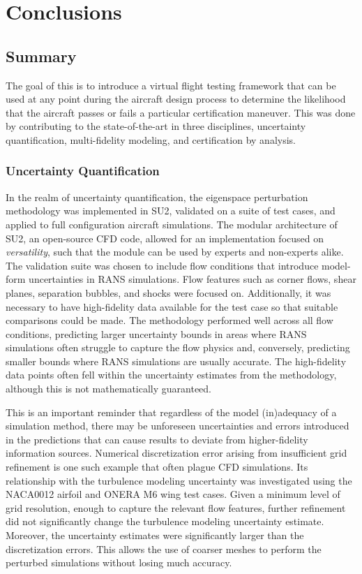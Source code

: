 \chapter{Conclusions} \label{chap:conclusions}

\section{Summary}
The goal of this is to introduce a virtual flight testing framework that can be used at any point during the aircraft design process to determine the likelihood that the aircraft passes or fails a particular certification maneuver. 
This was done by contributing to the state-of-the-art in three disciplines, uncertainty quantification, multi-fidelity modeling, and certification by analysis. 

\subsection{Uncertainty Quantification}

In the realm of uncertainty quantification, the eigenspace perturbation methodology \cite{iaccarino_eig_pert} was implemented in SU2, validated on a suite of test cases, and applied to full configuration aircraft simulations.
The modular architecture of SU2, an open-source CFD code, allowed for an implementation focused on \textit{versatility}, such that the module can be used by experts and non-experts alike. 
The validation suite was chosen to include flow conditions that introduce model-form uncertainties in RANS simulations.
Flow features such as corner flows, shear planes, separation bubbles, and shocks were focused on. 
Additionally, it was necessary to have high-fidelity data available for the test case so that suitable comparisons could be made.
The methodology performed well across all flow conditions, predicting larger uncertainty bounds in areas where RANS simulations often struggle to capture the flow physics and, conversely, predicting smaller bounds where RANS simulations are usually accurate.
The high-fidelity data points often fell within the uncertainty estimates from the methodology, although this is not mathematically guaranteed. 

This is an important reminder that regardless of the model (in)adequacy of a simulation method, there may be unforeseen uncertainties and errors introduced in the predictions that can cause results to deviate from higher-fidelity information sources. 
Numerical discretization error arising from insufficient grid refinement is one such example that often plague CFD simulations. 
Its relationship with the turbulence modeling uncertainty was investigated using the NACA0012 airfoil and ONERA M6 wing test cases.
Given a minimum level of grid resolution, enough to capture the relevant flow features, further refinement did not significantly change the turbulence modeling uncertainty estimate.
Moreover, the uncertainty estimates were significantly larger than the discretization errors. 
This allows the use of coarser meshes to perform the perturbed simulations without losing much accuracy. 

